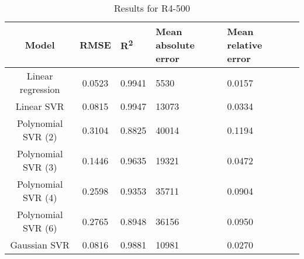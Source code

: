 \begin{table}[H]
\centering
\begin{adjustbox}{center}
\begin{tabular}{c | c M{1.2cm} M{2.5cm} M{2.5cm} M{1.8cm}}
Model & RMSE & R\textsuperscript{2} & Mean absolute error & Mean relative error \tabularnewline
\hline
Linear regression & 0.0523 & 0.9941 &   5530 & 0.0157 \\
Linear SVR & 0.0815 & 0.9947 &  13073 & 0.0334 \\
Polynomial SVR (2) & 0.3104 & 0.8825 &  40014 & 0.1194 \\
Polynomial SVR (3) & 0.1446 & 0.9635 &  19321 & 0.0472 \\
Polynomial SVR (4) & 0.2598 & 0.9353 &  35711 & 0.0904 \\
Polynomial SVR (6) & 0.2765 & 0.8948 &  36156 & 0.0950 \\
Gaussian SVR & 0.0816 & 0.9881 &  10981 & 0.0270 \\
\end{tabular}
\end{adjustbox}
\\
\caption{Results for R4-500}
\label{tab:coreonly_linear_R4_500}
\end{table}
